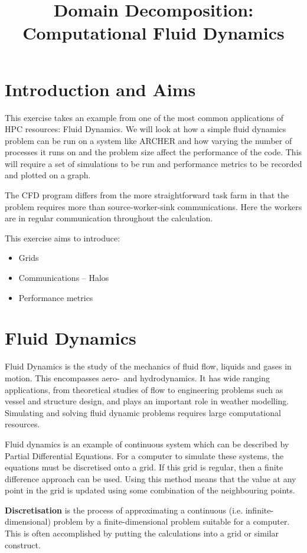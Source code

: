 \documentclass{article}
\title{Domain Decomposition: Computational Fluid Dynamics}
\begin{document}
\makeEPCCtitle

\section{Introduction and Aims} 

This exercise takes an example from one of the most common
applications of HPC resources: Fluid Dynamics. We will look at how a
simple fluid dynamics problem can be run on a system like ARCHER and
how varying the number of processes it runs on and the problem size
affect the performance of the code. This will require a set of
simulations to be run and performance metrics to be recorded and
plotted on a graph.

The CFD program differs from the more straightforward task farm in
that the problem requires more than source-worker-sink
communications. Here the workers are in regular communication
throughout the calculation.

This exercise aims to introduce:
\begin{itemize}
\item Grids
\item Communications -- Halos
\item Performance metrics
\end{itemize}

\section{Fluid Dynamics}

Fluid Dynamics is the study of the mechanics of fluid flow, liquids
and gases in motion. This encompasses aero-~and hydrodynamics. 
It has wide ranging applications, from theoretical studies of flow to
engineering problems such as vessel and structure design, and 
plays an important role in weather modelling. Simulating and solving
fluid dynamic problems requires large computational resources.

Fluid dynamics is an example of continuous system which can be
described by Partial Differential Equations. For a computer to
simulate these systems, the equations must be discretised onto a
grid. If this grid is regular, then a finite difference approach can
be used. Using this method means that the value at any point in the
grid is updated using some combination of the neighbouring points.

\textbf{Discretisation} is the process of approximating a continuous
(i.e. infinite-dimensional) problem by a finite-dimensional problem
suitable for a computer. This is often accomplished by putting the
calculations into a grid or similar construct.
\end{document}
